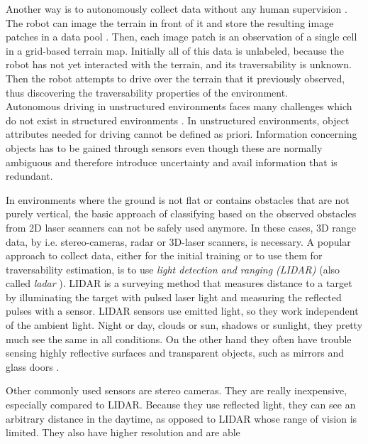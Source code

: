 \documentclass[12pt,a4paper,table,dvipsnames,tikz]{report}
\newcommand{\term}{\textit}
\newcommand{\acronym}{\MakeUppercase}
\begin{document}
	Another way is to autonomously collect data without any human supervision 
	\citep{Kim, Lee}. The robot can image the terrain in front of it and store the 
	resulting image patches in a data pool \citep{Kim}. Then, each image patch is an 
	observation of a single cell in a grid-based terrain map. Initially all of this 
	data is unlabeled, because the robot has not yet interacted with the terrain, and 
	its traversability is unknown. Then the robot attempts to drive over the 
	terrain that it previously observed, thus discovering the traversability 
	properties of the environment.
	\\
	
	Autonomous driving in unstructured environments faces many challenges which do 
	not exist in structured environments \citep{Shabbir}. In unstructured environments, 
	object attributes needed for driving cannot be defined as priori. Information 
	concerning objects has to be gained through sensors even though these are normally 
	ambiguous and therefore introduce uncertainty and avail information that is 
	redundant.
	\par
	In environments where the ground is not flat or contains obstacles that are 
	not purely vertical, the basic approach of classifying based on the observed 
	obstacles from \acronym{2d} laser scanners can not be safely used anymore. 
	In these cases, \acronym{3d} range data, by i.e. stereo-cameras, radar or 
	\acronym{3d}-laser scanners, is necessary. A popular approach to collect data, 
	either for the initial training or to use them for traversability estimation, is to use 
	\term{light detection and ranging (\acronym{lidar})} \citep{Suger, Lalonde} (also 
	called \term{ladar} \citep{Lalonde, Shneier}). \acronym{lidar} is a surveying 
	method that measures distance to a target by illuminating the target with pulsed 
	laser light and measuring the reflected pulses with a sensor. \acronym{lidar} 
	sensors use emitted light, so they work independent of the ambient light. Night 
	or day, clouds or sun, shadows or sunlight, they pretty much see the same in all 
	conditions. On the other hand they often have trouble sensing highly reflective 
	surfaces and transparent objects, such as mirrors and glass doors 
	\citep{HiroseGonet}.
	\par
	Other commonly used sensors are stereo cameras. They are really inexpensive, 
	especially compared to \acronym{lidar}. Because they use reflected light, they 
	can see an arbitrary distance in the daytime, as opposed to \acronym{lidar} 
	whose range of vision is limited. They also have higher resolution and are able 
\end{document}
